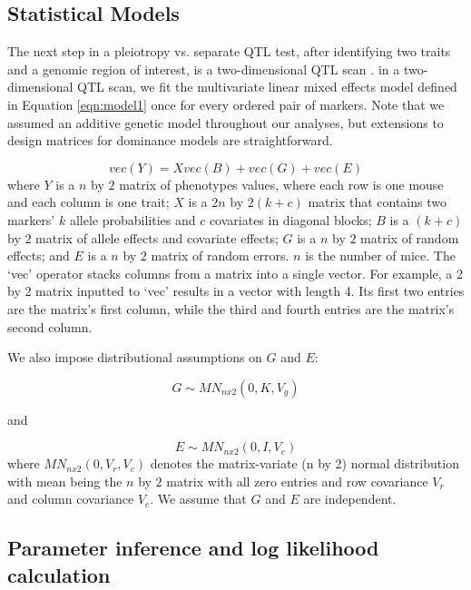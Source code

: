 \documentclass[12pt,twoside, lineno]{gsajnl}
\begin{document}
\subsection{Statistical Models}
The next step in a pleiotropy vs. separate QTL test, after identifying two traits and a genomic region of interest, is a two-dimensional QTL scan \citep{jiang1995multiple}. in a two-dimensional QTL scan, we fit the multivariate linear mixed effects model defined in Equation \ref{eqn:model1} once for every ordered pair of markers. Note that we assumed an additive genetic model throughout our analyses, but extensions to design matrices for dominance models are straightforward.


\begin{equation}
vec(Y) = X vec(B) + vec(G) + vec(E)
\label{eqn:model1}
\end{equation}
where $Y$ is a $n$ by $2$ matrix of phenotypes values, where each row is one mouse and each column is one trait; $X$ is a $2n$ by $2(k + c)$ matrix that contains two markers' $k$ allele probabilities and $c$ covariates in diagonal blocks; $B$ is a $(k + c)$ by $2$ matrix of allele effects and covariate effects; $G$ is a $n$ by $2$ matrix of random effects; and $E$ is a $n$ by $2$ matrix of random errors. $n$ is the number of mice. The `vec' operator stacks columns from a matrix into a single vector. For example, a 2 by 2 matrix inputted to `vec' results in a vector with length 4. Its first two entries are the matrix's first column, while the third and fourth entries are the matrix's second column.


We also impose distributional assumptions on $G$ and $E$:

\begin{equation}
G \sim MN_{n x 2}(0, K, V_g)
\label{eqn:model2}
\end{equation}

and

\begin{equation}
E \sim MN_{nx2}(0, I, V_e)
\label{eqn:model3}
\end{equation}
where $MN_{n x 2}(0, V_r, V_c)$ denotes the matrix-variate (n by 2) normal distribution with mean being the $n$ by $2$ matrix with all zero entries and row covariance $V_r$ and column covariance $V_c$. We assume that $G$ and $E$ are independent.


\subsection{Parameter inference and log likelihood calculation}
\end{document}
